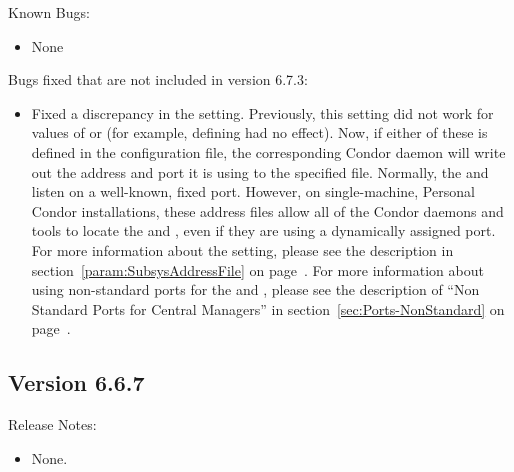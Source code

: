 \noindent Known Bugs:

\begin{itemize}

\item None

\end{itemize}

\noindent Bugs fixed that are not included in version 6.7.3:

\begin{itemize}

\item Fixed a discrepancy in the 
  setting.
  Previously, this setting did not work for  values of
   or  (for example, defining
   had no effect).
  Now, if either of these is defined in the configuration file,
  the corresponding Condor daemon will write out the address
  and port it is using to the specified file.
  Normally, the  and  listen on a
  well-known, fixed port.
  However, on single-machine, Personal Condor installations,
  these address files allow all of the Condor daemons and tools to locate
  the  and , even if they are
  using a dynamically assigned port.
  For more information about the 
  setting, please see the description in
  section~\ref{param:SubsysAddressFile} on
  page~\pageref{param:SubsysAddressFile}.
  For more information about using non-standard ports for the
   and , please see the
  description of ``Non Standard Ports for Central Managers'' in
  section~\ref{sec:Ports-NonStandard} on
  page~\pageref{sec:Ports-NonStandard}.

\end{itemize}



\subsection{\label{sec:New-6-6-7}Version 6.6.7}

\noindent Release Notes:

\begin{itemize}

\item None.

\end{itemize}

